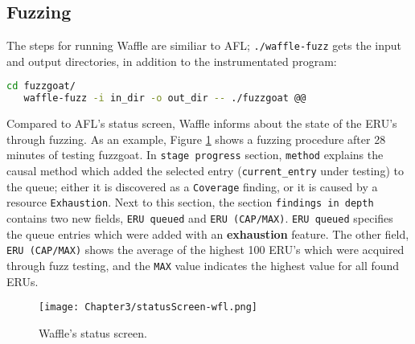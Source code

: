 
\subsection{Fuzzing}

The steps for running Waffle are similiar to AFL; \texttt{./waffle-fuzz} gets the input and output directories, in addition to the instrumentated program:

\begin{lstlisting}[language=bash,style=CommandStyle,label={lst:wafl-fuzzgoat-fuzz}]
   cd fuzzgoat/
   waffle-fuzz -i in_dir -o out_dir -- ./fuzzgoat @@
\end{lstlisting}

Compared to AFL's status screen, Waffle informs about the state of the ERU's through fuzzing. As an example, Figure \ref{fig:status-wfl} shows a fuzzing procedure after 28 minutes of testing fuzzgoat. In \texttt{stage progress} section, \texttt{method} explains the causal method which added the selected entry (\texttt{current\_entry} under testing) to the queue; either it is discovered as a \texttt{Coverage} finding, or it is caused by a resource \texttt{Exhaustion}. Next to this section, the section \texttt{findings in depth} contains two new fields, \texttt{ERU queued} and \texttt{ERU (CAP/MAX)}. \texttt{ERU queued} specifies the queue entries which were added with an \textbf{exhaustion} feature. The other field, \texttt{ERU (CAP/MAX)} shows the average of the highest 100 ERU's which were acquired through fuzz testing, and the \texttt{MAX} value indicates the highest value for all found ERUs. 

\begin{figure}[t]
   \texttt{[image: Chapter3/statusScreen-wfl.png]}
   \centering
   \caption{Waffle's status screen.}
   \label{fig:status-wfl}
\end{figure}

\newpage \ \newpage